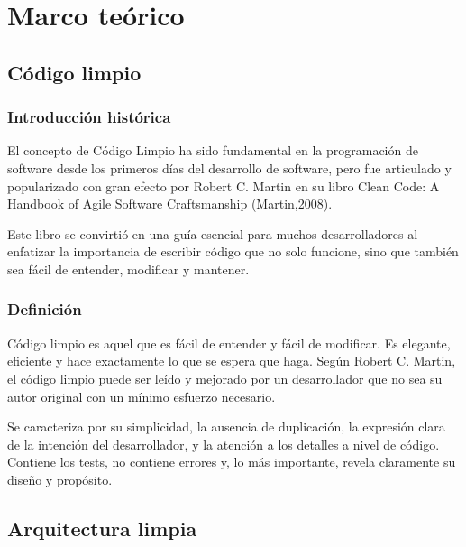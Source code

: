 \chapter{Marco teórico}\label{ch:chapter_2}


\section{Código limpio}
\subsection*{Introducción histórica}
El concepto de Código Limpio ha sido fundamental en la programación de software desde los primeros días del desarrollo
de software, pero fue articulado y popularizado con gran efecto por Robert C. Martin en su libro Clean Code: A Handbook
of Agile Software Craftsmanship (Martin,2008).

Este libro se convirtió en una guía esencial para muchos desarrolladores al enfatizar la importancia de escribir código
que no solo funcione, sino que también sea fácil de entender, modificar y mantener.

\subsection*{Definición}
Código limpio es aquel que es fácil de entender y fácil de modificar.
Es elegante, eficiente y hace exactamente lo que se espera que haga.
Según Robert C. Martin, el código limpio puede ser leído y mejorado por un
desarrollador que no sea su autor original con un mínimo esfuerzo necesario.

Se caracteriza por su simplicidad, la ausencia de duplicación, la expresión clara de la intención del desarrollador, y
la atención a los detalles a nivel de código.
Contiene los tests, no contiene errores y, lo más importante, revela claramente su diseño y propósito.


\section{Arquitectura limpia}
